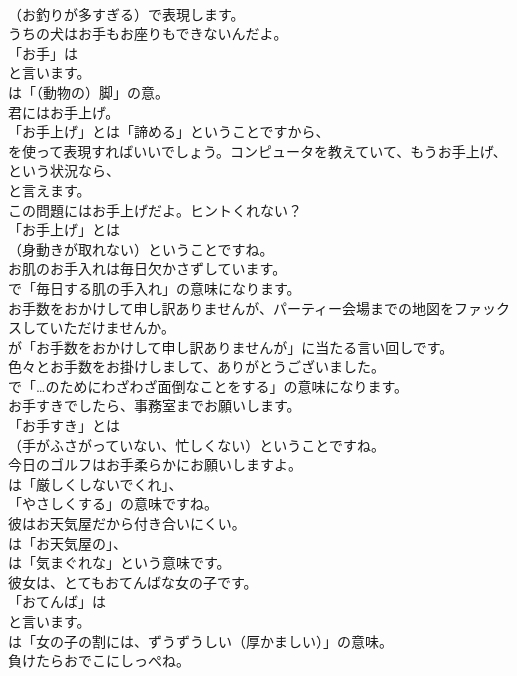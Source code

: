 \documentclass[8pt]{extreport}
\begin{document}
\begin{CJK}{UTF8}{min}
\\	（お釣りが多すぎる）で表現します。	
\\	うちの犬はお手もお座りもできないんだよ。 
\\	「お手」は 
\\	と言います。
\\	は「（動物の）脚」の意。	
\\	君にはお手上げ。 
\\	「お手上げ」とは「諦める」ということですから、
\\	を使って表現すればいいでしょう。コンピュータを教えていて、もうお手上げ、という状況なら、
\\	と言えます。	
\\	この問題にはお手上げだよ。ヒントくれない？ 
\\	「お手上げ」とは 
\\	（身動きが取れない）ということですね。	
\\	お肌のお手入れは毎日欠かさずしています。 
\\	で「毎日する肌の手入れ」の意味になります。	
\\	お手数をおかけして申し訳ありませんが、パーティー会場までの地図をファックスしていただけませんか。 
\\	が「お手数をおかけして申し訳ありませんが」に当たる言い回しです。	
\\	色々とお手数をお掛けしまして、ありがとうございました。 
\\	で「…のためにわざわざ面倒なことをする」の意味になります。	
\\	お手すきでしたら、事務室までお願いします。 
\\	「お手すき」とは
\\	（手がふさがっていない、忙しくない）ということですね。	
\\	今日のゴルフはお手柔らかにお願いしますよ。 
\\	は「厳しくしないでくれ」、
\\	「やさしくする」の意味ですね。	
\\	彼はお天気屋だから付き合いにくい。 
\\	は「お天気屋の」、
\\	は「気まぐれな」という意味です。	
\\	彼女は、とてもおてんばな女の子です。 
\\	「おてんば」は
\\	と言います。
\\	は「女の子の割には、ずうずうしい（厚かましい）」の意味。	
\\	負けたらおでこにしっぺね。 

\end{CJK}
\end{document}
